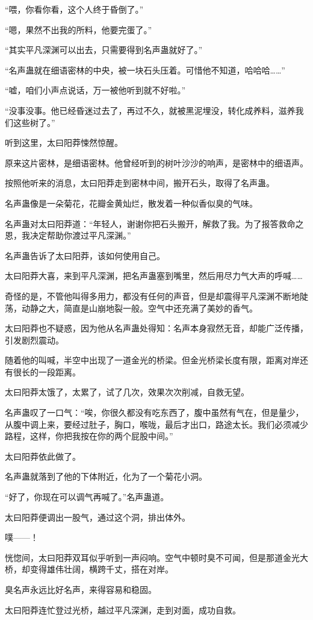 \begin{this_body}
“喂，你看你看，这个人终于昏倒了。”

“嗯，果然不出我的所料，他要完蛋了。”

“其实平凡深渊可以出去，只需要得到名声蛊就好了。”

“名声蛊就在细语密林的中央，被一块石头压着。可惜他不知道，哈哈哈……”

“嘘，咱们小声点说话，万一被他听到就不好啦。”

“没事没事。他已经昏迷过去了，再过不久，就被黑泥埋没，转化成养料，滋养我们这些树了。”

听到这里，太曰阳莽悚然惊醒。

原来这片密林，是细语密林。他曾经听到的树叶沙沙的响声，是密林中的细语声。

按照他听来的消息，太曰阳莽走到密林中间，搬开石头，取得了名声蛊。

名声蛊像是一朵菊花，花瓣金黄灿烂，散发着一种似香似臭的气味。

名声蛊对太曰阳莽道：“年轻人，谢谢你把石头搬开，解救了我。为了报答救命之恩，我决定帮助你渡过平凡深渊。”

名声蛊告诉了太曰阳莽，该如何使用自己。

太曰阳莽大喜，来到平凡深渊，把名声蛊塞到嘴里，然后用尽力气大声的呼喊……

奇怪的是，不管他叫得多用力，都没有任何的声音，但是却震得平凡深渊不断地陡荡，动静之大，简直是山崩地裂一般。空气中还充满了美妙的香气。

太曰阳莽也不疑惑，因为他从名声蛊处得知：名声本身寂然无音，却能广泛传播，引发剧烈震动。

随着他的叫喊，半空中出现了一道金光的桥梁。但金光桥梁长度有限，距离对岸还有很长的一段距离。

太曰阳莽太饿了，太累了，试了几次，效果次次削减，自救无望。

名声蛊叹了一口气：“唉，你很久都没有吃东西了，腹中虽然有气在，但是量少，从腹中调上来，要经过肚子，胸口，喉咙，最后才出口，路途太长。我们必须减少路程，这样，你把我按在你的两个屁股中间。”

太曰阳莽依此做了。

名声蛊就落到了他的下体附近，化为了一个菊花小洞。

“好了，你现在可以调气再喊了。”名声蛊道。

太曰阳莽便调出一股气，通过这个洞，排出体外。

噗——！

恍惚间，太曰阳莽双耳似乎听到一声闷响。空气中顿时臭不可闻，但是那道金光大桥，却变得雄伟壮阔，横跨千丈，搭在对岸。

臭名声永远比好名声，来得容易和稳固。

太曰阳莽连忙登过光桥，越过平凡深渊，走到对面，成功自救。

\end{this_body}

